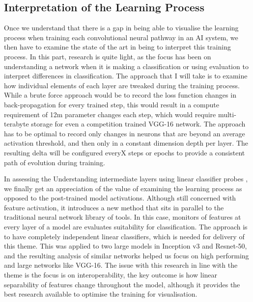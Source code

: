 \subsection{Interpretation of the Learning Process}

Once we understand that there is a gap in being able to visualise the learning process when training each convolutional neural pathway in an AI system, we then have to examine the state of the art in being to interpret this training process. In this part, research is quite light, as the focus has been on understanding a network when it is making a classification or using evaluation to interpret differences in classification. The approach that I will take is to examine how individual elements of each layer are tweaked during the training process. While a brute force approach would be to record the loss function changes in back-propagation for every trained step, this would result in a compute requirement of 12m parameter changes each step, which would require multi-terabyte storage for even a competition trained VGG-16 network. The approach has to be optimal to record only changes in neurons that are beyond an average activation threshold, and then only in a constant dimension depth per layer. The resulting delta will be configured everyX steps or epochs to provide a consistent path of evolution during training.

In assessing the Understanding intermediate layers using linear classifier probes \cite{alainUnderstandingIntermediateLayers2018} , we finally get an appreciation of the value of examining the learning process as opposed to the post-trained model activations. Although still concerned with feature activation, it introduces a new method that sits in parallel to the traditional neural network library of tools. In this case, monitors of features at every layer of a model are evaluates suitability for classification. The approach is to have completely independent linear classifiers, which is needed for delivery of this theme. This was applied to two large models in Inception v3 and Resnet-50, and the resulting analysis of similar networks helped us focus on high performing and large networks like VGG-16. The issue with this research in line with the theme is the focus is on interoperability, the key outcome is how linear separability of features change throughout the model, although it provides the best research available to optimise the training for visualisation.
    
